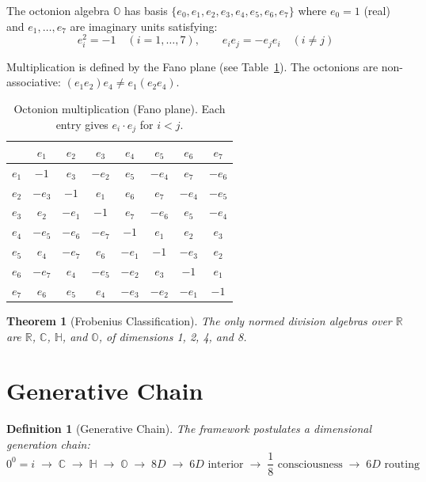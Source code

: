 \documentclass[11pt]{article}
\newtheorem{theorem}{Theorem}
\newtheorem{definition}{Definition}
\begin{document}
The octonion algebra $\mathbb{O}$ has basis $\{e_0, e_1, e_2, e_3, e_4, e_5, e_6, e_7\}$ where $e_0 = 1$ (real) and $e_1, \ldots, e_7$ are imaginary units satisfying:
\begin{equation}
e_i^2 = -1 \quad (i = 1, \ldots, 7), \qquad e_i e_j = -e_j e_i \quad (i \neq j)
\end{equation}

Multiplication is defined by the Fano plane (see Table~\ref{tab:fano}). The octonions are non-associative: $(e_1 e_2) e_4 \neq e_1 (e_2 e_4)$.

\begin{table}[ht]
\centering
\caption{Octonion multiplication (Fano plane). Each entry gives $e_i \cdot e_j$ for $i < j$.}
\label{tab:fano}
\begin{tabular}{c|ccccccc}
\toprule
 & $e_1$ & $e_2$ & $e_3$ & $e_4$ & $e_5$ & $e_6$ & $e_7$ \\
\midrule
$e_1$ & $-1$ & $e_3$ & $-e_2$ & $e_5$ & $-e_4$ & $e_7$ & $-e_6$ \\
$e_2$ & $-e_3$ & $-1$ & $e_1$ & $e_6$ & $e_7$ & $-e_4$ & $-e_5$ \\
$e_3$ & $e_2$ & $-e_1$ & $-1$ & $e_7$ & $-e_6$ & $e_5$ & $-e_4$ \\
$e_4$ & $-e_5$ & $-e_6$ & $-e_7$ & $-1$ & $e_1$ & $e_2$ & $e_3$ \\
$e_5$ & $e_4$ & $-e_7$ & $e_6$ & $-e_1$ & $-1$ & $-e_3$ & $e_2$ \\
$e_6$ & $-e_7$ & $e_4$ & $-e_5$ & $-e_2$ & $e_3$ & $-1$ & $e_1$ \\
$e_7$ & $e_6$ & $e_5$ & $e_4$ & $-e_3$ & $-e_2$ & $-e_1$ & $-1$ \\
\bottomrule
\end{tabular}
\end{table}

\begin{theorem}[Frobenius Classification]
The only normed division algebras over $\mathbb{R}$ are $\mathbb{R}$, $\mathbb{C}$, $\mathbb{H}$, and $\mathbb{O}$, of dimensions 1, 2, 4, and 8.
\end{theorem}

\section{Generative Chain}

\begin{definition}[Generative Chain]
The framework postulates a dimensional generation chain:
\begin{equation}
0^0 = i \;\to\; \mathbb{C} \;\to\; \mathbb{H} \;\to\; \mathbb{O} \;\to\; 8D \;\to\; 6D \text{ interior} \;\to\; \frac{1}{8} \text{ consciousness} \;\to\; 6D \text{ routing}
\end{equation}
\end{definition}
\end{document}
